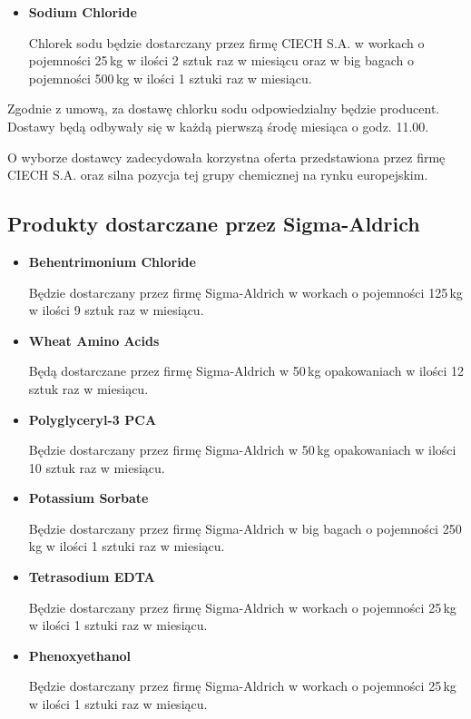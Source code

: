 \begin{itemize}
	\item \textbf{Sodium Chloride}

	Chlorek sodu będzie dostarczany przez firmę \textsf{CIECH S.A.} w workach o pojemności 25\,kg w ilości 2 sztuk raz w miesiącu oraz w big bagach o pojemności 500\,kg w ilości 1 sztuki raz w miesiącu. 
\end{itemize}\vspace{\baselineskip}

	Zgodnie z umową, za dostawę chlorku sodu odpowiedzialny będzie producent. Dostawy będą odbywały się w każdą pierwszą środę miesiąca o godz. 11.00.

	O wyborze dostawcy zadecydowała korzystna oferta przedstawiona przez firmę \textsf{CIECH S.A.} oraz silna pozycja tej grupy chemicznej na rynku europejskim.

\subsection{Produkty dostarczane przez \textsf{Sigma-Aldrich}}

\begin{itemize}
	\item \textbf{Behentrimonium Chloride}

	Będzie dostarczany przez firmę \textsf{Sigma-Aldrich} w workach o pojemności 125\,kg w ilości 9 sztuk raz w miesiącu.

	\item \textbf{Wheat Amino Acids}

	Będą dostarczane przez firmę \textsf{Sigma-Aldrich} w 50\,kg opakowaniach w ilości 12 sztuk raz w miesiącu.

	\item \textbf{Polyglyceryl-3 PCA }

	Będzie dostarczany przez firmę \textsf{Sigma-Aldrich} w 50\,kg opakowaniach w ilości 10 sztuk raz w miesiącu.

	\item \textbf{Potassium Sorbate}

	Będzie dostarczany przez firmę \textsf{Sigma-Aldrich} w big bagach o pojemności 250\,kg w ilości 1 sztuki raz w miesiącu.

	\item \textbf{Tetrasodium EDTA}

	Będzie dostarczany przez firmę \textsf{Sigma-Aldrich} w workach o pojemności 25\,kg w ilości 1 sztuki raz w miesiącu.

	\item \textbf{Phenoxyethanol}

	Będzie dostarczany przez firmę \textsf{Sigma-Aldrich} w workach o pojemności 25\,kg w ilości 1 sztuki raz w miesiącu.
\end{itemize}\vspace{\baselineskip}


